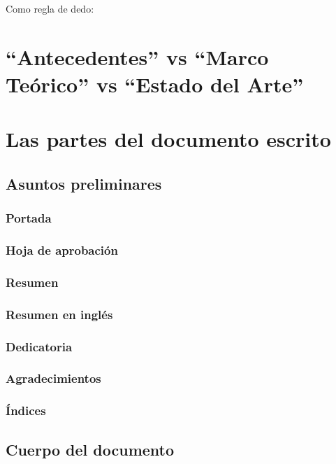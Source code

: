 Como regla de dedo:

\section{``Antecedentes'' vs ``Marco Teórico'' vs ``Estado del Arte''}

\section{Las partes del documento escrito}

\subsection{Asuntos preliminares}

\subsubsection{Portada}

\subsubsection{Hoja de aprobación}

\subsubsection{Resumen}

\subsubsection{Resumen en inglés}

\subsubsection{Dedicatoria}

\subsubsection{Agradecimientos}

\subsubsection{Índices}

\subsection{Cuerpo del documento}

